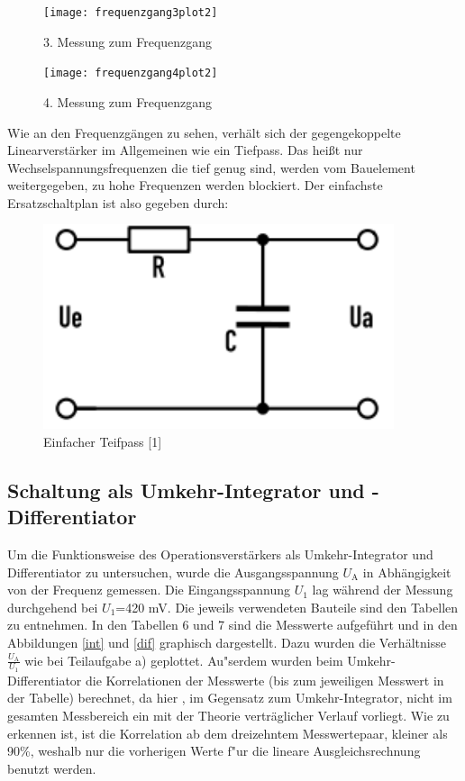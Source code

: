 \documentclass{scrartcl}
\begin{document}
\newpage

\begin{figure}[!h]
\centering
\texttt{[image: frequenzgang3plot2]}
\caption{3. Messung zum Frequenzgang}
\label{integrator}
\end{figure}

\begin{figure}[!h]
\centering
\texttt{[image: frequenzgang4plot2]}
\caption{4. Messung zum Frequenzgang}
\label{integrator}
\end{figure}

\newpage


Wie an den Frequenzgängen zu sehen, verhält sich der gegengekoppelte Linearverstärker im Allgemeinen wie ein Tiefpass.
Das heißt nur Wechselspannungsfrequenzen die tief genug sind, werden vom Bauelement weitergegeben, zu hohe Frequenzen werden blockiert.
Der einfachste Ersatzschaltplan ist also gegeben durch:
\begin{figure}[H]
  \centering
  \includegraphics[height=6cm]{tiefpass.png}
  \caption{Einfacher Teifpass [1]}
  \label{abb1}
\end{figure}


 \subsection{Schaltung als Umkehr-Integrator und -Differentiator}
Um die Funktionsweise des Operationsverstärkers als Umkehr-Integrator und Differentiator zu untersuchen, wurde die Ausgangsspannung $U_\text{A}$ in Abhängigkeit von der Frequenz gemessen. Die Eingangsspannung $U_1$ lag während der Messung durchgehend bei $U_1$=420 mV.
Die jeweils verwendeten Bauteile sind den Tabellen zu entnehmen.
In den Tabellen 6 und 7 sind die Messwerte aufgeführt und in den Abbildungen \ref{int} und \ref{dif} graphisch dargestellt. Dazu wurden die Verhältnisse $\frac{U_\text{A}}{U_1}$ wie bei Teilaufgabe a) geplottet.
Au"serdem wurden beim Umkehr-Differentiator die Korrelationen der Messwerte (bis zum jeweiligen Messwert in der Tabelle) berechnet, da hier , im Gegensatz zum Umkehr-Integrator, nicht im gesamten Messbereich ein mit der Theorie verträglicher Verlauf vorliegt.
Wie zu erkennen ist, ist die Korrelation ab dem dreizehntem Messwertepaar, kleiner als 90\%, weshalb nur die vorherigen Werte f"ur die lineare Ausgleichsrechnung benutzt werden.
\
\end{document}
